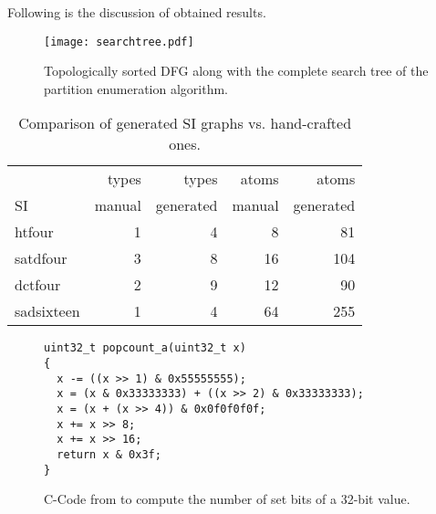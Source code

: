 Following is the discussion of obtained results.

\begin{figure}[ht]
  \center
  \texttt{[image: searchtree.pdf]}
  \caption{Topologically sorted DFG along with the complete search tree of the partition enumeration algorithm.}
  \label{fig:searchtree}
\end{figure}



\begin{table}
  \centering
  \begin{tabular}{lrrrr}
                &   types  &      types  &   atoms  &      atoms  \\
    SI          &  manual  &  generated  &  manual  &  generated  \\
    \hline
    htfour      &       1  &          4  &       8  &         81  \\
    satdfour    &       3  &          8  &      16  &        104  \\
    dctfour     &       2  &          9  &      12  &         90  \\
    sadsixteen  &       1  &          4  &      64  &        255  \\
  \end{tabular}
  \caption{Comparison of generated SI graphs vs. hand-crafted ones.}
  \label{tab:manualeval}
\end{table}


\begin{figure}
\lstset{language=C}
\begin{lstlisting}[label={lst:popcount}]
uint32_t popcount_a(uint32_t x)
{
  x -= ((x >> 1) & 0x55555555);
  x = (x & 0x33333333) + ((x >> 2) & 0x33333333);
  x = (x + (x >> 4)) & 0x0f0f0f0f;
  x += x >> 8;
  x += x >> 16;
  return x & 0x3f;
}
\end{lstlisting}
\caption{C-Code from \cite{warren2003hacker} to compute the number of set bits of a 32-bit value.}
\label{fig:popcount}
\end{figure}

